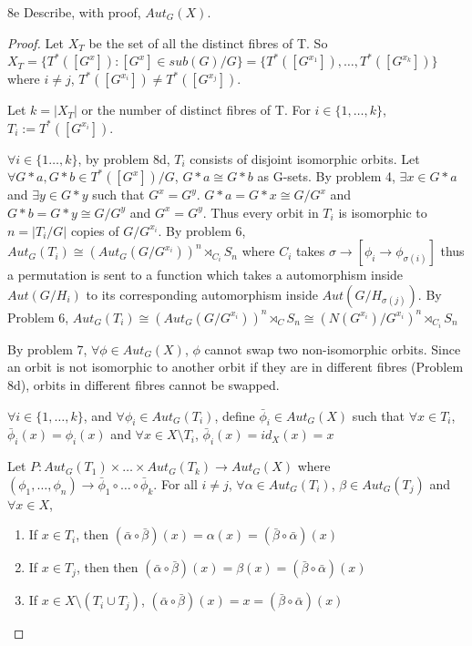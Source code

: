 \documentclass{article}
\begin{document}
\begin{PROB}{8e}\label{Problem 8e.}
    Describe, with proof, $Aut_G(X)$.
\end{PROB}
\begin{proof}
    Let $X_T$ be the set of all the distinct fibres of T. So $X_T = \{T^*([G^x]) : [G^x] \in sub(G)/G\} = \{T^*([G^{x_1}]), \ldots, T^*([G^{x_k}])\}$ where $i \neq j$, $T^*([G^{x_i}]) \neq T^*([G^{x_j}])$. 

    Let $k = |X_T|$ or the number of distinct fibres of T. For $i \in \{1, \ldots, k\}$, $T_i := T^*([G^{x_i}])$.

    $\forall i \in \{1 \ldots, k\}$, by problem 8d, $T_i$ consists of disjoint isomorphic orbits. Let $\forall G \ast a, G \ast b \in T^*([G^x])/G$, $G \ast a \cong G \ast b$ as G-sets. By problem 4, $\exists x \in G \ast a$ and $\exists y \in G \ast y$ such that $G^x = G^y$. $G \ast a = G \ast x \cong G/G^x$ and $G \ast b = G \ast y \cong G/G^y$ and $G^x = G^y$. Thus every orbit in $T_i$ is isomorphic to $n = |T_i/G|$ copies of $G/G^{x_i}$. By problem 6, $Aut_G(T_i) \cong (Aut_G(G/G^{x_i}))^n \rtimes_{C_i} S_n$ where $C_i$ takes $\sigma \to [\phi_i \to \phi_{\sigma(i)}]$ thus a permutation is sent to a function which takes a automorphism inside $Aut(G/H_i)$ to its corresponding automorphism inside $Aut(G/H_{\sigma(j)})$. By Problem 6,  $Aut_G(T_i) \cong (Aut_G(G/G^{x_i}))^n \rtimes_C S_n \cong (N(G^{x_i})/G^{x_i})^n \rtimes_{C_i} S_n$

    By problem 7, $\forall \phi \in Aut_G(X)$, $\phi$ cannot swap two non-isomorphic orbits. Since an orbit is not isomorphic to another orbit if they are in different fibres (Problem 8d), orbits in different fibres cannot be swapped. 

    $\forall i \in \{1, \ldots, k\}$, and $\forall \phi_i \in Aut_G(T_i)$, define $\bar \phi_i \in Aut_G(X)$ such that $\forall x \in T_i$, $\bar \phi_i(x) = \phi_i(x)$ and $\forall x \in X \setminus T_i$, $\bar \phi_i(x) = id_X(x) = x$

    Let $P: Aut_G(T_1) \times \ldots \times Aut_G(T_k) \to Aut_G(X)$ where $(\phi_1, \ldots, \phi_n) \to \bar \phi_1 \circ \ldots \circ \bar \phi_k$. For all $i \neq j$, $\forall \alpha \in Aut_G(T_i)$, $\beta \in Aut_G(T_j)$ and $\forall x \in X$,

    \begin{enumerate}
        \item If $x \in T_i$, then $(\bar \alpha \circ \bar \beta)(x) = \alpha(x) = (\bar \beta \circ \bar \alpha)(x)$
        \item If $x \in T_j$, then then $(\bar \alpha \circ \bar \beta)(x) = \beta(x) = (\bar \beta \circ \bar \alpha)(x)$
        \item If $x \in X \setminus (T_i \cup T_j)$, $(\bar \alpha \circ \bar \beta)(x) = x = (\bar \beta \circ \bar \alpha)(x)$
    \end{enumerate}


\end{proof}
\end{document}
